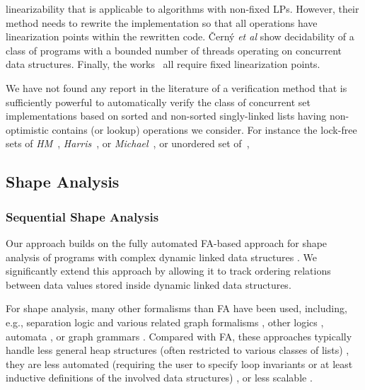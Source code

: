 linearizability that is applicable to algorithms with non-fixed LPs.
%
However, their method needs to rewrite the implementation so that all operations 
have linearization points within the rewritten code.
%
\v{C}ern{\'y} {\it et al} \cite{CernyRZCA:CAV10} show decidability of a class
of programs with a bounded number of threads operating on concurrent data structures.
%
%
Finally, the works~\cite{AHHR:integrated,BLMRS:cav08,Vafeiadis:vmcai09}
all require fixed linearization points.

We have not found any report in the literature of a
verification method that is sufficiently powerful to
automatically verify the class of concurrent set
implementations based on sorted and non-sorted
singly-linked lists having non-optimistic contains (or lookup) operations we consider. For instance %
the lock-free sets of {\it HM}~\cite{ArtOfMpP},
{\it Harris}~\cite{Harris:list}, or {\it Michael}~\cite{Michael:list},
or unordered set of~\cite{Zhang:unorderedlist},


\subsection{Shape Analysis}
\subsubsection{Sequential Shape Analysis}
Our approach builds on the fully automated FA-based
approach for shape analysis of programs with complex dynamic linked data
structures \cite{forester11,Forester}. We significantly extend this approach by
allowing it to track ordering relations between data values stored inside
dynamic linked data structures. 

For shape analysis, many other formalisms than FA have been used, including,
e.g., separation logic and various related graph formalisms
\cite{Hongseok:SL,thor10,rival11,Kamil:SL}, other logics \cite{SagivRW02,Jakob:ML},
automata \cite{artmc12}, or graph grammars \cite{Jonathan:Shape}. Compared with FA,
these approaches typically handle less general heap structures (often restricted
to various classes of lists) \cite{Hongseok:SL,Kamil:SL}, they are less
automated (requiring the user to specify loop invariants or at least inductive
definitions of the involved data structures)
\cite{thor10,rival11,Kamil:SL,Jonathan:Shape}, or less scalable \cite{artmc12}.

